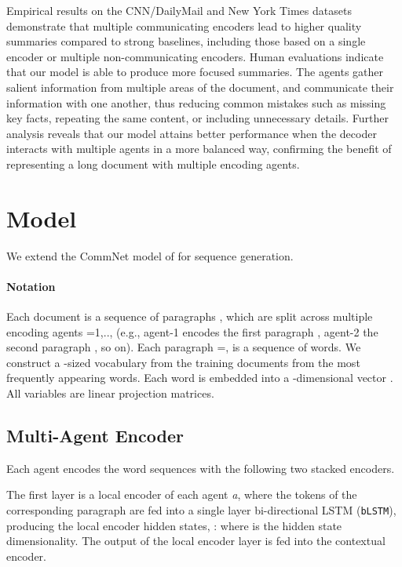 \documentclass[11pt,a4paper]{article}
\newcommand{\yejin}[1]{{\color{cyan}yc:[#1]}}
\begin{document}
 
Empirical results on the CNN/DailyMail and New York Times datasets demonstrate that multiple communicating encoders lead to higher quality summaries compared to strong baselines, including those based on a single encoder or multiple non-communicating encoders. 
Human evaluations indicate that our model is able to produce more focused summaries. The agents gather salient information from multiple areas of the document, and communicate their information with one another, thus reducing common mistakes such as missing key facts, repeating the same content, or including unnecessary details. Further analysis reveals that our model attains better performance when the decoder interacts with multiple agents in a more balanced way, confirming the benefit of representing a long document with multiple encoding agents.  










 \section{Model}
\begin{comment}
\yejin{I think we should say something about commNet... (either to say that we follow their framework or present a modified version, if the architecture is similar enough...?)}
\end{comment}
We extend the CommNet model of \citet{commnet} for sequence generation. 
\paragraph{Notation}
Each document  is a sequence of paragraphs , which are split across multiple encoding agents =1,.., (e.g., agent-1 encodes the first paragraph , agent-2 the second paragraph , so on). Each paragraph =, is a sequence of  words. We construct a -sized vocabulary from the training documents from the most frequently appearing words.
Each word  is embedded into a -dimensional vector . All  variables are linear projection matrices.
\subsection{Multi-Agent Encoder}
\label{ucbir}
Each agent encodes the word sequences with the following two stacked encoders. 

 The first layer is a local encoder of each agent \textit{a}, where 
the tokens of the corresponding paragraph  are fed into a single layer bi-directional LSTM (\texttt{bLSTM}), producing the local encoder hidden states, : 
where  is the hidden state dimensionality. 
The output of the local encoder layer is fed into the contextual encoder. 
\end{document}
